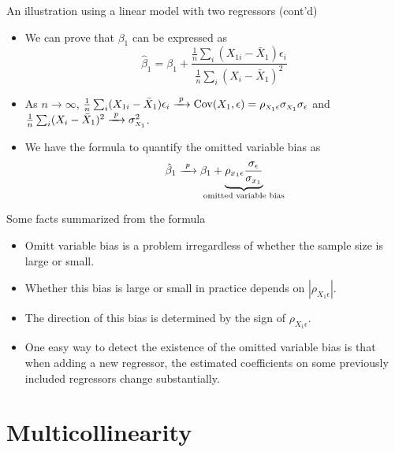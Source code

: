 \documentclass[presentation,10pt]{beamer}
\newcommand{\cov}{\mathrm{Cov}}
\newcommand{\rarrowd}[1]{\xrightarrow{\text{ \textit #1 }}}
\begin{document}
\begin{frame}[label={sec:org3a9867a}]{An illustration using a linear model with two regressors (cont'd)}
\begin{itemize}
\item We can prove that \(\beta_1\) can be expressed as
\[ \hat{\beta}_1 = \beta_1 + \frac{\frac{1}{n}\sum_i
  (X_{1i} - \bar{X}_1) \epsilon_i}{\frac{1}{n}\sum_i (X_i - \bar{X}_1)^2} \]

\item As \(n \rightarrow \infty\), \(\frac{1}{n}\sum_i
  (X_{1i} - \bar{X}_1) \epsilon_i \rarrowd{p} \cov(X_1, \epsilon) = \rho_{{\scriptscriptstyle X_1} \epsilon} \sigma_{\scriptscriptstyle X_1} \sigma_{\epsilon}\)
and \(\frac{1}{n}\sum_i (X_i - \bar{X}_1)^2 \rarrowd{p}
  \sigma^2_{\scriptscriptstyle X_1}\).

\item We have the formula to quantify the omitted variable bias as
\begin{equation}
\label{eq:omb-4}
\hat{\beta}_1 \rarrowd{p} \beta_1 + \underbrace{\rho_{x_1 \epsilon} \frac{\sigma_{\epsilon}}{\sigma_{x_1}}}_{\mathclap{\text{omitted variable bias}}}
\end{equation}
\end{itemize}
\end{frame}

\begin{frame}[label={sec:orgae47735}]{Some facts summarized from the formula}
\begin{itemize}
\item Omitt variable bias is a problem irregardless of whether the sample
size is large or small.

\item Whether this bias is large or small in practice depends on
\(|\rho_{X_{1} \epsilon}|\).

\item The direction of this bias is determined by the sign of \(\rho_{X_{1}
  \epsilon}\).

\item One easy way to detect the existence of the omitted variable bias is
that when adding a new regressor, the estimated coefficients on some
previously included regressors change substantially.
\end{itemize}
\end{frame}

\section{Multicollinearity}
\label{sec:orge398ace}
\setcounter{tocdepth}{1}
\tableofcontents[currentsection]
\end{document}
